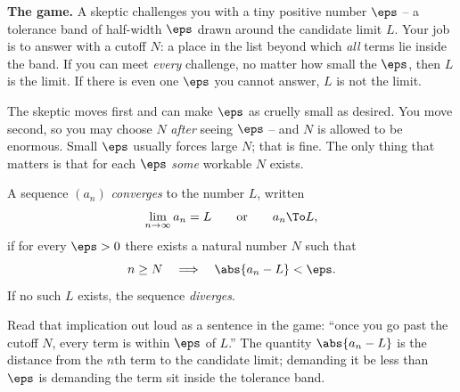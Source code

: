 \begin{intuitionbox}
\textbf{The game.} A skeptic challenges you with a tiny positive number
$\eps$ -- a tolerance band of half-width $\eps$ drawn around the candidate
limit $L$. Your job is to answer with a cutoff $N$: a place in the list beyond
which \emph{all} terms lie inside the band. If you can meet \emph{every}
challenge, no matter how small the $\eps$, then $L$ is the limit. If there is
even one $\eps$ you cannot answer, $L$ is not the limit.

The skeptic moves first and can make $\eps$ as cruelly small as desired. You
move second, so you may choose $N$ \emph{after} seeing $\eps$ -- and $N$ is
allowed to be enormous. Small $\eps$ usually forces large $N$; that is fine. The
only thing that matters is that for each $\eps$ \emph{some} workable $N$ exists.
\end{intuitionbox}

\begin{definition}
\label{ch28:def-limit}
A sequence $(a_n)$ \emph{converges} to the number $L$, written
\[
  \lim_{n\to\infty} a_n = L
  \qquad\text{or}\qquad
  a_n \To L,
\]
if for every $\eps > 0$ there exists a natural number $N$ such that
\[
  n \ge N \quad\Longrightarrow\quad \abs{a_n - L} < \eps .
\]
If no such $L$ exists, the sequence \emph{diverges}.
\end{definition}

Read that implication out loud as a sentence in the game: ``once you go past the
cutoff $N$, every term is within $\eps$ of $L$.'' The quantity $\abs{a_n - L}$ is
the distance from the $n$th term to the candidate limit; demanding it be less
than $\eps$ is demanding the term sit inside the tolerance band.

